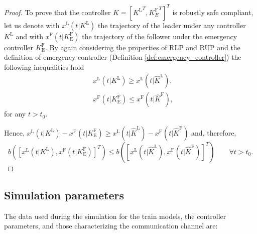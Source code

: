\documentclass[letterpaper, 10 pt, conference]{ieeeconf}
\newcounter{Definition}
\theoremstyle{definition}
\theoremstyle{nopoint}
\begin{document}
\begin{proof}
	To prove that the controller $K=[{K^\mathrm{L}}^T, {K^\mathrm{F}_E}^T]^T$ is robustly safe compliant, let us denote with
	$x^\mathrm{L}(t | K^\mathrm{L})$ the trajectory of the leader under any controller $K^\mathrm{L}$ and with $x^\mathrm{F}(t | K_\mathrm{E}^\mathrm{F})$ the trajectory of the follower under the emergency controller $K_\mathrm{E}^\mathrm{F}$.  
	By again considering the properties of RLP and RUP and 
	the definition of emergency controller (Definition \ref{def:emergency_controller}) the following inequalities hold
	\begin{eqnarray}
		&x^\mathrm{L}(t | K^\mathrm{L})\geq x^\mathrm{L}(t | \hat{K}^\mathrm{L}), \label{eq:inequality2_leader}\\
		& x^\mathrm{F}(t | K_\mathrm{E}^\mathrm{F})\leq x^\mathrm{F}(t | \hat{K}^\mathrm{F}),\label{eq:inequality2_follower}
	\end{eqnarray}
	for any $t>t_0$.
	
	Hence, $x^\mathrm{L}(t | K^\mathrm{L})-x^\mathrm{F}(t | K_\mathrm{E}^\mathrm{F}) \geq x^\mathrm{L}(t | \hat{K}^\mathrm{L})-x^\mathrm{F}(t | \hat{K}^\mathrm{F})$ and, therefore, 
	\begin{equation*}
		b([x^\mathrm{L}(t | K^\mathrm{L}),x^\mathrm{F}(t |K_\mathrm{E}^\mathrm{F})]^T)\leq  b([x^\mathrm{L}(t | \hat{K}^\mathrm{L}),x^\mathrm{F}(t |\hat{K}^\mathrm{F})]^T) \qquad \forall t>t_0. 
	\end{equation*}
	
	
\end{proof}


\subsection{Simulation parameters}
\label{appendix:parameters}


The data used during the simulation for the train models, the controller parameters, and those characterizing the communication channel are:
\end{document}

